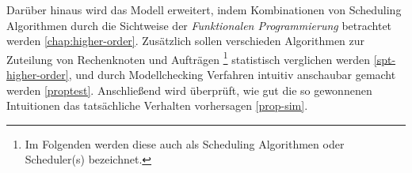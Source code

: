 Darüber hinaus wird das Modell erweitert, indem Kombinationen von Scheduling Algorithmen durch die Sichtweise der \emph{Funktionalen Programmierung} betrachtet werden \ref{chap:higher-order}.
Zusätzlich sollen verschieden Algorithmen zur Zuteilung von Rechenknoten und Aufträgen \footnote{Im Folgenden werden diese auch als Scheduling Algorithmen oder Scheduler(s) bezeichnet.} statistisch verglichen werden \ref{spt-higher-order}, und durch Modellchecking Verfahren intuitiv anschaubar gemacht werden \ref{proptest}. Anschließend wird überprüft, wie gut die so gewonnenen Intuitionen das tatsächliche Verhalten vorhersagen \ref{prop-sim}.\\



